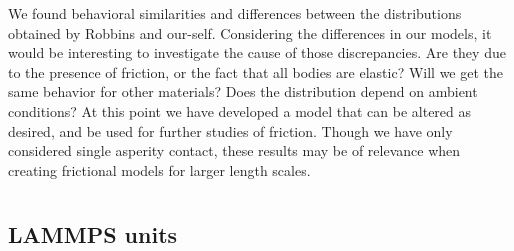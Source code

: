 \documentclass[twoside,english]{uiofysmaster}
\begin{document}
We found behavioral similarities and differences between the distributions obtained by Robbins and our-self. 
Considering the differences in our models, it would be interesting to investigate the cause of those discrepancies. 
Are they due to the presence of friction, or the fact that all bodies are elastic? 
Will we get the same behavior for other materials?
Does the distribution depend on ambient conditions?
At this point we have developed a model that can be altered as desired, and be used for further studies of friction.
Though we have only considered single asperity contact, these results may be of relevance when creating frictional models for larger length scales.

  





 





\appendix

\chapter{ }
\section{LAMMPS units}
\end{document}
